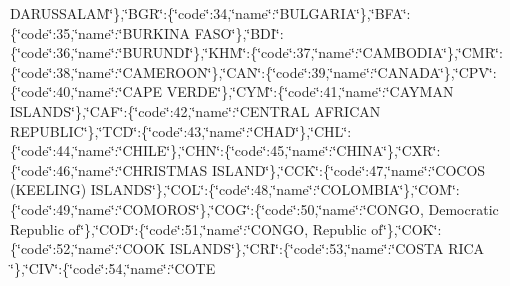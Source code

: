 {D\-A\-R\-U\-S\-S\-A\-L\-A\-M\char`\"{}\},\char`\"{}B\-G\-R\char`\"{}\-:\{\char`\"{}code\char`\"{}\-:34,\char`\"{}name\char`\"{}\-:\char`\"{}B\-U\-L\-G\-A\-R\-I\-A\char`\"{}\},\char`\"{}B\-F\-A\char`\"{}\-:\{\char`\"{}code\char`\"{}\-:35,\char`\"{}name\char`\"{}\-:\char`\"{}B\-U\-R\-K\-I\-N\-A F\-A\-S\-O\char`\"{}\},\char`\"{}B\-D\-I\char`\"{}\-:\{\char`\"{}code\char`\"{}\-:36,\char`\"{}name\char`\"{}\-:\char`\"{}B\-U\-R\-U\-N\-D\-I\char`\"{}\},\char`\"{}K\-H\-M\char`\"{}\-:\{\char`\"{}code\char`\"{}\-:37,\char`\"{}name\char`\"{}\-:\char`\"{}C\-A\-M\-B\-O\-D\-I\-A\char`\"{}\},\char`\"{}C\-M\-R\char`\"{}\-:\{\char`\"{}code\char`\"{}\-:38,\char`\"{}name\char`\"{}\-:\char`\"{}C\-A\-M\-E\-R\-O\-O\-N\char`\"{}\},\char`\"{}C\-A\-N\char`\"{}\-:\{\char`\"{}code\char`\"{}\-:39,\char`\"{}name\char`\"{}\-:\char`\"{}C\-A\-N\-A\-D\-A\char`\"{}\},\char`\"{}C\-P\-V\char`\"{}\-:\{\char`\"{}code\char`\"{}\-:40,\char`\"{}name\char`\"{}\-:\char`\"{}C\-A\-P\-E V\-E\-R\-D\-E\char`\"{}\},\char`\"{}C\-Y\-M\char`\"{}\-:\{\char`\"{}code\char`\"{}\-:41,\char`\"{}name\char`\"{}\-:\char`\"{}C\-A\-Y\-M\-A\-N I\-S\-L\-A\-N\-D\-S\char`\"{}\},\char`\"{}C\-A\-F\char`\"{}\-:\{\char`\"{}code\char`\"{}\-:42,\char`\"{}name\char`\"{}\-:\char`\"{}C\-E\-N\-T\-R\-A\-L A\-F\-R\-I\-C\-A\-N R\-E\-P\-U\-B\-L\-I\-C\char`\"{}\},\char`\"{}T\-C\-D\char`\"{}\-:\{\char`\"{}code\char`\"{}\-:43,\char`\"{}name\char`\"{}\-:\char`\"{}C\-H\-A\-D\char`\"{}\},\char`\"{}C\-H\-L\char`\"{}\-:\{\char`\"{}code\char`\"{}\-:44,\char`\"{}name\char`\"{}\-:\char`\"{}C\-H\-I\-L\-E\char`\"{}\},\char`\"{}C\-H\-N\char`\"{}\-:\{\char`\"{}code\char`\"{}\-:45,\char`\"{}name\char`\"{}\-:\char`\"{}C\-H\-I\-N\-A\char`\"{}\},\char`\"{}C\-X\-R\char`\"{}\-:\{\char`\"{}code\char`\"{}\-:46,\char`\"{}name\char`\"{}\-:\char`\"{}C\-H\-R\-I\-S\-T\-M\-A\-S I\-S\-L\-A\-N\-D\char`\"{}\},\char`\"{}C\-C\-K\char`\"{}\-:\{\char`\"{}code\char`\"{}\-:47,\char`\"{}name\char`\"{}\-:\char`\"{}C\-O\-C\-O\-S (K\-E\-E\-L\-I\-N\-G) I\-S\-L\-A\-N\-D\-S\char`\"{}\},\char`\"{}C\-O\-L\char`\"{}\-:\{\char`\"{}code\char`\"{}\-:48,\char`\"{}name\char`\"{}\-:\char`\"{}C\-O\-L\-O\-M\-B\-I\-A\char`\"{}\},\char`\"{}C\-O\-M\char`\"{}\-:\{\char`\"{}code\char`\"{}\-:49,\char`\"{}name\char`\"{}\-:\char`\"{}C\-O\-M\-O\-R\-O\-S\char`\"{}\},\char`\"{}C\-O\-G\char`\"{}\-:\{\char`\"{}code\char`\"{}\-:50,\char`\"{}name\char`\"{}\-:\char`\"{}C\-O\-N\-G\-O, Democratic Republic of\char`\"{}\},\char`\"{}C\-O\-D\char`\"{}\-:\{\char`\"{}code\char`\"{}\-:51,\char`\"{}name\char`\"{}\-:\char`\"{}C\-O\-N\-G\-O, Republic of\char`\"{}\},\char`\"{}C\-O\-K\char`\"{}\-:\{\char`\"{}code\char`\"{}\-:52,\char`\"{}name\char`\"{}\-:\char`\"{}C\-O\-O\-K I\-S\-L\-A\-N\-D\-S\char`\"{}\},\char`\"{}C\-R\-I\char`\"{}\-:\{\char`\"{}code\char`\"{}\-:53,\char`\"{}name\char`\"{}\-:\char`\"{}C\-O\-S\-T\-A R\-I\-C\-A \char`\"{}\},\char`\"{}C\-I\-V\char`\"{}\-:\{\char`\"{}code\char`\"{}\-:54,\char`\"{}name\char`\"{}\-:\char`\"{}C\-O\-T\-E }
